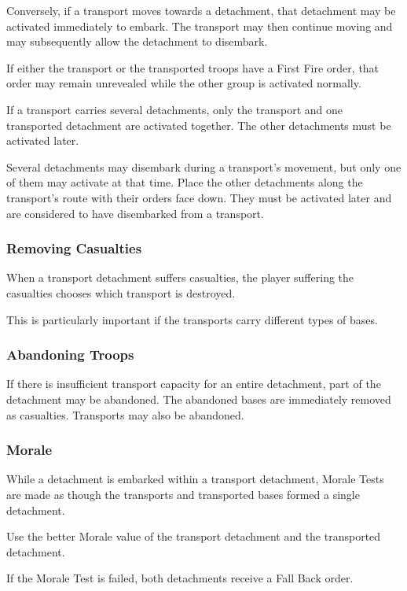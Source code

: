 Conversely, if a transport moves towards a detachment, that detachment may be activated immediately to embark. The transport may then continue moving and may subsequently allow the detachment to disembark.

If either the transport or the transported troops have a First Fire order, that order may remain unrevealed while the other group is activated normally.

If a transport carries several detachments, only the transport and one transported detachment are activated together. The other detachments must be activated later.

Several detachments may disembark during a transport's movement, but only one of them may activate at that time. Place the other detachments along the transport's route with their orders face down. They must be activated later and are considered to have disembarked from a transport.

\subsubsection{Removing Casualties}

When a transport detachment suffers casualties, the player suffering the casualties chooses which transport is destroyed.

This is particularly important if the transports carry different types of bases.

\subsubsection{Abandoning Troops}

If there is insufficient transport capacity for an entire detachment, part of the detachment may be abandoned. The abandoned bases are immediately removed as casualties. Transports may also be abandoned.

\subsubsection{Morale}

While a detachment is embarked within a transport detachment, Morale Tests are made as though the transports and transported bases formed a single detachment.

Use the better Morale value of the transport detachment and the transported detachment.

If the Morale Test is failed, both detachments receive a Fall Back order.

